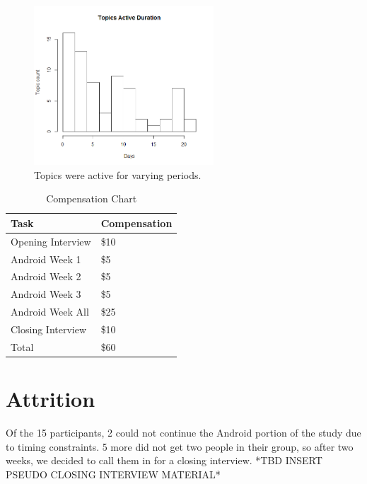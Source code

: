     \begin{figure}
    \centering
    \includegraphics[width=0.6\textwidth]{topic_days_active.png}
    \caption[Duration of Topics] {
      Topics were active for varying periods.
    }
    \label{fig:topic_age}
    \end{figure}


\begin{table}[h]
\centering
\caption{Compensation Chart}
\label{table:compensation}
\begin{tabular}{ l l }
Task & Compensation \\
\hline
Opening Interview & \$10 \\[5pt]
Android Week 1 & \$5 \\[5pt]
Android Week 2 & \$5 \\[5pt]
Android Week 3 & \$5 \\[5pt]
Android Week All & \$25 \\[5pt]
Closing Interview & \$10 \\[5pt]
\hline
Total & \$60
\end{tabular}
\end{table}


    


  \section{Attrition}
  \label{sec:Android}
  Of the 15 participants, 2 could not continue the Android portion
  of the study due to timing constraints.
  5 more did not get two people in their group,
  so after two weeks,
  we decided to call them in for a closing interview.
  *TBD INSERT PSEUDO CLOSING INTERVIEW MATERIAL*

